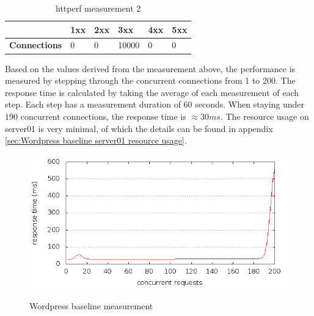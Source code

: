 \documentclass[Measurements]{subfiles}
\begin{document}
\begin{table}[H]
\caption{httperf measurement 2}
\begin{tabular}{|p{2cm}|p{}|p{}|p{}|p{}|p{}|}
\hline
 & \textbf{1xx} & \textbf{2xx} & \textbf{3xx} & \textbf{4xx} & \textbf{5xx} \\ \hline
\textbf{Connections} & 0 & 0 & 10000 & 0 & 0 \\ \hline
\end{tabular}
\label{fig:Baseline measurement 2}
\end{table}

Based on the values derived from the measurement above, the performance is measured by stepping through the concurrent connections from 1 to 200. The response time is calculated by taking the average of each measurement of  each step. Each step has a measurement duration of 60 seconds. When staying under $190$ concurrent connections, the response time is \mbox{$\approx 30 ms$}. The resource usage on server01 is very minimal, of which the details can be found in appendix \ref{sec:Wordpress baseline server01 resource usage}.

\begin{figure}[H]
\caption{Wordpress baseline measurement}
\centering
\includegraphics[scale=0.55] {images/results/baseline_wp/output.png}
\label{fig:Baseline performance measurement}
\end{figure}
\end{document}

